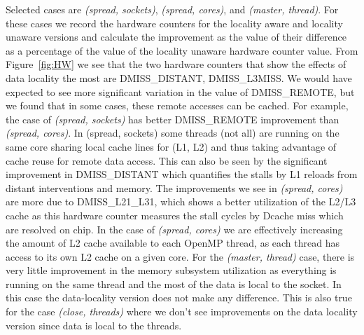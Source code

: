 Selected cases are \textit{(spread, sockets)},  \textit{(spread, cores)}, and  \textit{(master, thread)}. For these cases we record the hardware counters for the locality aware and locality unaware versions and calculate the improvement as the value of their difference as a percentage of the value of the locality unaware hardware counter value. 
From Figure~\ref{fig:HW} we see that the two hardware counters that show the effects of data locality the most are DMISS\_DISTANT, DMISS\_L3MISS.
We would have expected to see more significant variation in the value of DMISS\_REMOTE, but we found that in some cases, these remote accesses can be cached.
For example, the case of \textit{(spread, sockets)} has better DMISS\_REMOTE improvement than  \textit{(spread, cores)}. 
In (spread, sockets) some threads (not all) are running on the same core sharing local cache lines for (L1, L2) and thus taking advantage of cache reuse for remote data access. 
This can also be seen by the significant improvement in DMISS\_DISTANT which quantifies the stalls by L1 reloads from distant interventions and memory. 
The improvements we see in  \textit{(spread, cores)} are more due to DMISS\_L21\_L31, which shows a better utilization of the L2/L3 cache as this hardware counter measures the stall cycles by Dcache miss which are resolved on chip. 
In the case of  \textit{(spread, cores)} we are effectively increasing the amount of 
L2 cache available to each OpenMP thread, as each thread has access to its own L2 cache on a given core. 
For the \textit{(master, thread)} case, there is very little improvement in the memory subsystem utilization as everything is running on the same thread and the most of the data is local to the socket. In this case the data-locality version does not make any difference. This is also true for the case  \textit{(close, threads)} where
 we don't see improvements on the data locality version since data is local to the threads.


